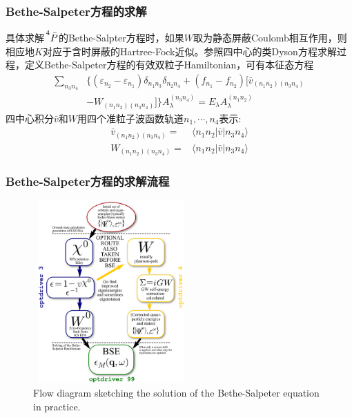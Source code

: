 {\frame
{
	\frametitle{\textrm{Bethe-Salpeter}方程的求解}
	具体求解$\sideset{^4}{}{\mathop{\bar{P}}}$的\textrm{Bethe-Salpter}方程时，如果$W$取为静态屏蔽\textrm{Coulomb}相互作用，则相应地$K$对应于含时屏蔽的\textrm{Hartree-Fock}近似。参照四中心的类\textrm{Dyson}方程求解过程，定义\textrm{Bethe-Salpeter}方程的有效双粒子\textrm{Hamiltonian}，可有本征态方程
	\begin{displaymath}
		\begin{aligned}
			\sum_{n_3n_4}&\{(\varepsilon_{n_2}-\varepsilon_{n_1})\delta_{n_1n_3}\delta_{n_2n_4}+(f_{n_1}-f_{n_2})[\bar{v}_{(n_1n_2)(n_3n_4)}\\
			&-W_{(n_1n_2)(n_3n_4)}]\}A_{\lambda}^{(n_3n_4)}=E_{\lambda}A_{\lambda}^{(n_1n_2)}
		\end{aligned}
	\end{displaymath}
	四中心积分$\bar{v}$和$W$用四个准粒子波函数轨道$n_1,\cdots,n_4$表示:
	\begin{displaymath}
		\begin{aligned}
			\bar{v}_{(n_1n_2)(n_3n_4)}=&\langle n_1n_2|\bar{v}|n_3n_4\rangle\\	
			W_{(n_1n_2)(n_3n_4)}=&\langle n_1n_2|\bar{v}|n_3n_4\rangle	
		\end{aligned}
	\end{displaymath}
{\fontsize{8.5pt}{6.2pt}}
}

\frame
{
	\frametitle{\textrm{Bethe-Salpeter}方程的求解流程}
\begin{figure}[h!]
\centering
\vspace{-10pt}
\includegraphics[height=2.75in,width=2.35in,viewport=0 0 600 735,clip]{Figures/BSE_solution.png}
\caption{\textrm{\tiny Flow diagram sketching the solution of the Bethe-Salpeter equation in practice.}}%
\label{GW-BSE_solution}
\end{figure}
}

}
